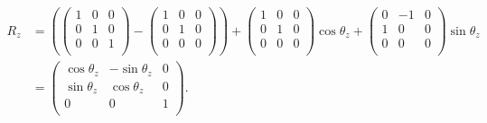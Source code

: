 \documentclass[12pt]{article}
\begin{document}
\begin{equation}
\begin{split}
R_z &= 
(\begin{pmatrix}
1 & 0 & 0 \\
0 & 1 & 0 \\
0 & 0 & 1 \\
\end{pmatrix}
-
\begin{pmatrix}
1 & 0 & 0 \\
0 & 1 & 0 \\
0 & 0 & 0 \\
\end{pmatrix})
+
\begin{pmatrix}
1 & 0 & 0 \\
0 & 1 & 0 \\
0 & 0 & 0 \\
\end{pmatrix}
\cos\theta_z
+
\begin{pmatrix}
0 & -1 & 0 \\
1 & 0 & 0 \\
0 & 0 & 0 \\
\end{pmatrix}
\sin\theta_z
\\ &=
\begin{pmatrix}
\cos\theta_z & -\sin\theta_z & 0 \\
\sin\theta_z & \cos\theta_z & 0 \\
0 & 0 & 1 \\
\end{pmatrix}.
\end{split}
\end{equation}
\end{document}
